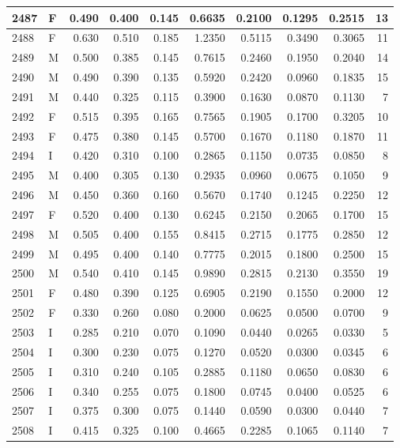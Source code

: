 \documentclass[9pt,twocolumn,twoside,]{pnas-new}
\begin{document}
\begin{tabular}{l|l|r|r|r|r|r|r|r|r}
\hline
2487 & F & 0.490 & 0.400 & 0.145 & 0.6635 & 0.2100 & 0.1295 & 0.2515 & 13\\
\hline
2488 & F & 0.630 & 0.510 & 0.185 & 1.2350 & 0.5115 & 0.3490 & 0.3065 & 11\\
\hline
2489 & M & 0.500 & 0.385 & 0.145 & 0.7615 & 0.2460 & 0.1950 & 0.2040 & 14\\
\hline
2490 & M & 0.490 & 0.390 & 0.135 & 0.5920 & 0.2420 & 0.0960 & 0.1835 & 15\\
\hline
2491 & M & 0.440 & 0.325 & 0.115 & 0.3900 & 0.1630 & 0.0870 & 0.1130 & 7\\
\hline
2492 & F & 0.515 & 0.395 & 0.165 & 0.7565 & 0.1905 & 0.1700 & 0.3205 & 10\\
\hline
2493 & F & 0.475 & 0.380 & 0.145 & 0.5700 & 0.1670 & 0.1180 & 0.1870 & 11\\
\hline
2494 & I & 0.420 & 0.310 & 0.100 & 0.2865 & 0.1150 & 0.0735 & 0.0850 & 8\\
\hline
2495 & M & 0.400 & 0.305 & 0.130 & 0.2935 & 0.0960 & 0.0675 & 0.1050 & 9\\
\hline
2496 & M & 0.450 & 0.360 & 0.160 & 0.5670 & 0.1740 & 0.1245 & 0.2250 & 12\\
\hline
2497 & F & 0.520 & 0.400 & 0.130 & 0.6245 & 0.2150 & 0.2065 & 0.1700 & 15\\
\hline
2498 & M & 0.505 & 0.400 & 0.155 & 0.8415 & 0.2715 & 0.1775 & 0.2850 & 12\\
\hline
2499 & M & 0.495 & 0.400 & 0.140 & 0.7775 & 0.2015 & 0.1800 & 0.2500 & 15\\
\hline
2500 & M & 0.540 & 0.410 & 0.145 & 0.9890 & 0.2815 & 0.2130 & 0.3550 & 19\\
\hline
2501 & F & 0.480 & 0.390 & 0.125 & 0.6905 & 0.2190 & 0.1550 & 0.2000 & 12\\
\hline
2502 & F & 0.330 & 0.260 & 0.080 & 0.2000 & 0.0625 & 0.0500 & 0.0700 & 9\\
\hline
2503 & I & 0.285 & 0.210 & 0.070 & 0.1090 & 0.0440 & 0.0265 & 0.0330 & 5\\
\hline
2504 & I & 0.300 & 0.230 & 0.075 & 0.1270 & 0.0520 & 0.0300 & 0.0345 & 6\\
\hline
2505 & I & 0.310 & 0.240 & 0.105 & 0.2885 & 0.1180 & 0.0650 & 0.0830 & 6\\
\hline
2506 & I & 0.340 & 0.255 & 0.075 & 0.1800 & 0.0745 & 0.0400 & 0.0525 & 6\\
\hline
2507 & I & 0.375 & 0.300 & 0.075 & 0.1440 & 0.0590 & 0.0300 & 0.0440 & 7\\
\hline
2508 & I & 0.415 & 0.325 & 0.100 & 0.4665 & 0.2285 & 0.1065 & 0.1140 & 7\\

\end{tabular}
\end{document}
